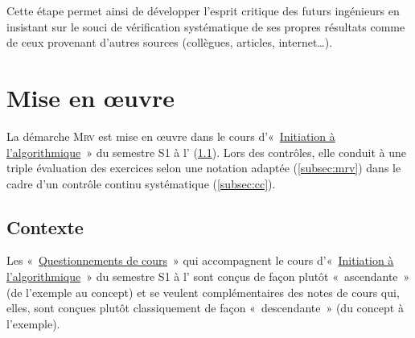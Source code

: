 Cette étape permet ainsi de développer l'esprit critique des futurs ingénieurs en 
insistant sur le souci de vérification systématique de ses propres résultats
comme de ceux provenant d'autres sources (collègues, articles, internet\ldots).

\section{Mise en \oe uvre}\label{sec:application}
La démarche \textsc{Mrv} est mise en \oe uvre dans le cours 
d'«~\href{http://www.enib.fr/~tisseau/pdf/course/info-S1.pdf}{Initiation à l'algorithmique}~» 
du semestre S1 à l'\enib{} (\ref{subsec:contexte}). 
Lors des contrôles, elle conduit à une triple évaluation des exercices 
selon une notation adaptée (\ref{subsec:mrv}) dans le cadre d'un contrôle continu 
systématique (\ref{subsec:cc}). 


\subsection{Contexte}\label{subsec:contexte}

Les «~\href{http://www.enib.fr/~tisseau/pdf/course/q-info-S1.pdf}{Questionnements de cours}~»
qui accompagnent le cours d'«~\href{http://www.enib.fr/~tisseau/pdf/course/info-S1.pdf}{Initiation à l'algorithmique}~» 
du semestre S1 à l'\enib{} sont conçus de façon plutôt «~ascendante~» (de l'exemple au concept) et se veulent 
complémentaires des notes de cours qui, elles, sont conçues plutôt classiquement
de façon «~descendante~» (du concept à l'exemple).

